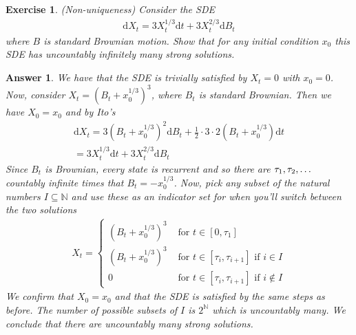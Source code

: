 \documentclass[12pt]{article}
\theoremstyle{colon}
\newtheorem{exercise}{Exercise}
\newtheorem*{answer}{Answer}
\begin{document}
\clearpage

\begin{exercise}
  (Non-uniqueness) Consider the SDE
  \begin{gather*}
    \text{d} X_t = 3 X_t^{1/3} \text{d} t + 3 X_t^{2/3} \text{d} B_t
  \end{gather*}
  where $B$ is standard Brownian motion. Show that for any initial condition $x_0$ this SDE has uncountably infinitely many strong solutions.
\end{exercise}

\begin{answer}
  We have that the SDE is trivially satisfied by $X_t = 0$ with $x_0 = 0$. Now, consider $X_t = (B_t + x_0^{1/3})^3$, where $B_t$ is standard Brownian. Then we have $X_0 = x_0$ and by Ito's
  \begin{gather*}
    \text{d} X_t = 3(B_t + x_0^{1/3})^2 \text{d} B_t + \frac{1}{2} \cdot 3 \cdot 2 (B_t + x_0^{1/3}) \text{d} t \\
    = 3 X_t^{1/3} \text{d} t + 3 X_t^{2/3} \text{d} B_t
  \end{gather*}
  Since $B_t$ is Brownian, every state is recurrent and so there are $\tau_1, \tau_2, \mathellipsis$ countably infinite times that $B_t = - x_0^{1/3}$. Now, pick any subset of the natural numbers $I \subseteq \mathbb{N}$ and use these as an indicator set for when you'll switch between the two solutions
  \begin{gather*}
    X_t = \begin{cases}
      (B_t + x_0^{1/3})^3 & \text{ for } t \in [0, \tau_1] \\
      (B_t + x_0^{1/3})^3 & \text{ for } t \in [\tau_i, \tau_{i+1}] \text{ if } i \in I \\
      0 & \text{ for } t \in [\tau_i, \tau_{i+1}] \text{ if } i \notin I
    \end{cases}
  \end{gather*}
  We confirm that $X_0 = x_0$ and that the SDE is satisfied by the same steps as before. The number of possible subsets of $I$ is $2^{\mathbb{N}}$ which is uncountably many. We conclude that there are uncountably many strong solutions.
\end{answer}

\clearpage
\end{document}
